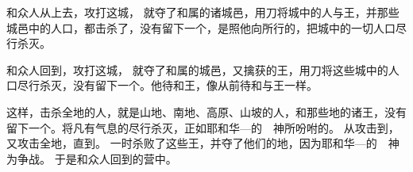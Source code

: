 {\par }{\PP {}和{}众人从{}上{}去，攻打这城，
就夺了{}和属{}的诸城邑，用刀将城中的人与王，并那些城邑中的人口，都击杀了，没有留下一个，是照他向{}所行的，把城中的一切人口尽行杀灭。
\par }{\PP {}和{}众人回到{}，攻打这城，
就夺了{}和属{}的城邑，又擒获{}的王，用刀将这些城中的人口尽行杀灭，没有留下一个。他待{}和{}王，像从前待{}和{}与{}王一样。
\par }{\PP {}这样，{}击杀全地的人，就是山地、南地、高原、山坡的人，和那些地的诸王，没有留下一个。将凡有气息的尽行杀灭，正如耶和华—{}的　神所吩咐的。
从{}攻击到{}，又攻击{}全地，直到{}。
一时杀败了这些王，并夺了他们的地，因为耶和华—{}的　神为{}争战。
于是{}和{}众人回到{}的营中。

}
